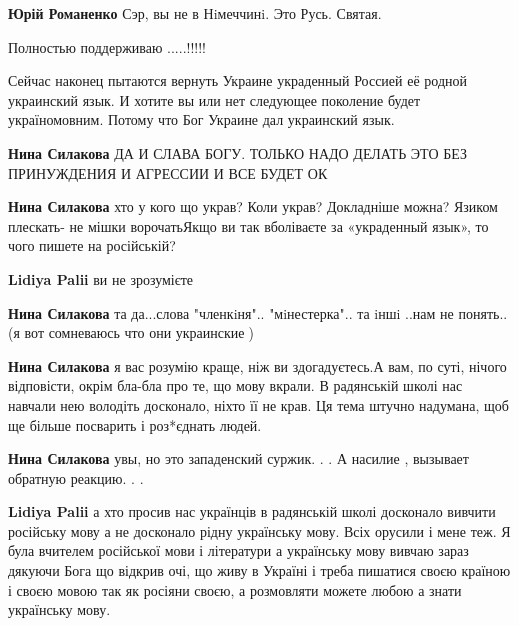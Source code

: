 \begin{itemize}
\begin{itemize}
\textbf{Юрій Романенко} Сэр, вы не в Нiмеччинi. Это Русь. Святая.

\end{itemize}

Полностью поддерживаю .....!!!!!


Сейчас наконец пытаются вернуть Украине украденный Россией её родной украинский
язык. И хотите вы или нет следующее поколение будет україномовним. Потому что
Бог Украине дал украинский язык.

\begin{itemize}
\textbf{Нина Силакова} ДА И СЛАВА БОГУ. ТОЛЬКО НАДО ДЕЛАТЬ ЭТО БЕЗ ПРИНУЖДЕНИЯ И АГРЕССИИ И ВСЕ БУДЕТ ОК

\textbf{Нина Силакова} хто у кого що украв? Коли украв? Докладніше можна?
Язиком плескать- не мішки ворочатьЯкщо ви так вболіваєте за «украденный язык»,
то чого пишете на російській?

\textbf{Lidiya Palii} ви не зрозумієте

\textbf{Нина Силакова}
та да...слова
"членкiня"..
"мiнестерка"..
та iншi ..нам не понять..
(я вот сомневаюсь что они украинские🤔)

\textbf{Нина Силакова} я вас розумію краще, ніж ви здогадуєтесь.А вам, по суті,
нічого відповісти, окрім бла-бла про те, що мову вкрали. В радянській школі нас
навчали нею володіть досконало, ніхто її не крав. Ця тема штучно надумана, щоб
ще більше посварить і роз*єднать людей.

\textbf{Нина Силакова} увы, но это западенский суржик. . . А насилие , вызывает обратную реакцию. . .

\textbf{Lidiya Palii} а хто просив нас українців в радянській школі досконало
вивчити російську мову а не досконало рідну українську мову. Всіх орусили і
мене теж. Я була вчителем російської мови і літератури а українську мову вивчаю
зараз дякуючи Бога що відкрив очі, що живу в Україні і треба пишатися своєю
країною і своєю мовою так як росіяни своєю, а розмовляти можете любою а знати
українську мову.


\end{itemize}
\end{itemize}
